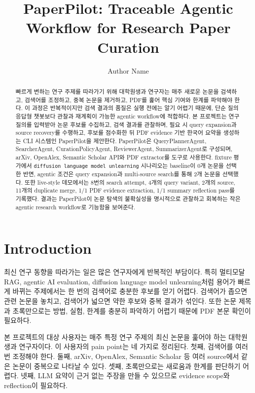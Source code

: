\documentclass[sigconf,nonacm]{acmart}
\title{PaperPilot: Traceable Agentic Workflow for Research Paper Curation}
\author{Author Name}
\affiliation{%
  \institution{Soongsil University}
  \country{Republic of Korea}
}
\begin{document}
\begin{abstract}
빠르게 변하는 연구 주제를 따라가기 위해 대학원생과 연구자는 매주 새로운 논문을 검색하고, 검색어를 조정하고, 중복 논문을 제거하고, PDF를 훑어 핵심 기여와 한계를 파악해야 한다. 이 과정은 반복적이지만 검색 결과의 품질은 실행 전에는 알기 어렵기 때문에, 단순 질의응답형 챗봇보다 관찰과 재계획이 가능한 agentic workflow에 적합하다. 본 프로젝트는 연구 질의를 입력받아 논문 후보를 수집하고, 검색 결과를 관찰하며, 필요 시 query expansion과 source recovery를 수행하고, 후보를 점수화한 뒤 PDF evidence 기반 한국어 요약을 생성하는 CLI 시스템인 PaperPilot을 제안한다. PaperPilot은 QueryPlannerAgent, SearcherAgent, CurationPolicyAgent, ReviewerAgent, SummarizerAgent로 구성되며, arXiv, OpenAlex, Semantic Scholar API와 PDF extractor를 도구로 사용한다. fixture 평가에서 \texttt{diffusion language model unlearning} 시나리오는 baseline이 0개 논문을 선택한 반면, agentic 조건은 query expansion과 multi-source search를 통해 2개 논문을 선택했다. 또한 live-style 데모에서는 8번의 search attempt, 4개의 query variant, 2개의 source, 11개의 duplicate merge, 1/1 PDF evidence extraction, 1/1 summary reflection pass를 기록했다. 결과는 PaperPilot이 논문 탐색의 불확실성을 명시적으로 관찰하고 회복하는 작은 agentic research workflow로 기능함을 보여준다.
\end{abstract}


\maketitle

\section{Introduction}

최신 연구 동향을 따라가는 일은 많은 연구자에게 반복적인 부담이다. 특히 멀티모달 RAG, agentic AI evaluation, diffusion language model unlearning처럼 용어가 빠르게 바뀌는 주제에서는 한 번의 검색어로 충분한 후보를 얻기 어렵다. 검색어가 좁으면 관련 논문을 놓치고, 검색어가 넓으면 약한 후보와 중복 결과가 섞인다. 또한 논문 제목과 초록만으로는 방법, 실험, 한계를 충분히 파악하기 어렵기 때문에 PDF 본문 확인이 필요하다.

본 프로젝트의 대상 사용자는 매주 특정 연구 주제의 최신 논문을 훑어야 하는 대학원생과 연구자이다. 이 사용자의 pain point는 네 가지로 정리된다. 첫째, 검색어를 여러 번 조정해야 한다. 둘째, arXiv, OpenAlex, Semantic Scholar 등 여러 source에서 같은 논문이 중복으로 나타날 수 있다. 셋째, 초록만으로는 새로움과 한계를 판단하기 어렵다. 넷째, LLM 요약이 근거 없는 주장을 만들 수 있으므로 evidence scope와 reflection이 필요하다.
\end{document}
